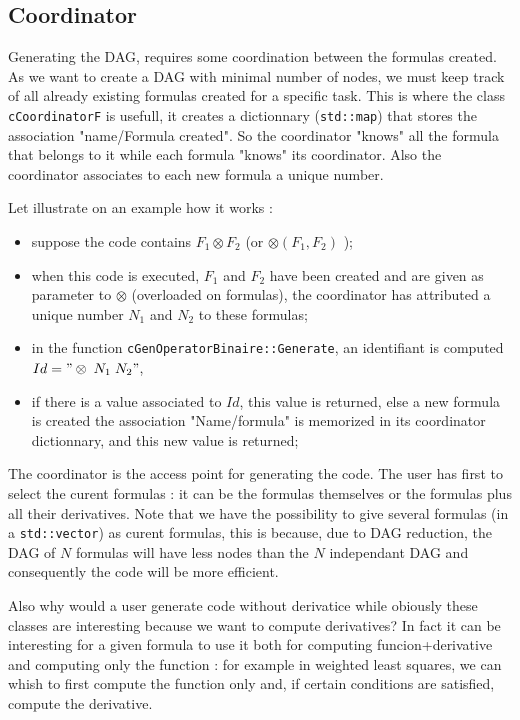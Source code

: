 
\subsection{Coordinator}

Generating the DAG, requires some coordination between the formulas created.
As we want to create a DAG with  minimal number of nodes, we must keep track
of all already existing formulas created for a specific task.
This is where the class {\tt cCoordinatorF} is usefull,  it creates a dictionnary ({\tt std::map})
that stores the association "name/Formula created".  So the coordinator "knows" all the 
formula that belongs to it while each formula "knows" its coordinator. Also the coordinator
associates to each new formula a unique number.

Let illustrate on an example how it works :

\begin{itemize}
	\item  suppose the code contains  $F_1\otimes F_2$  (or  $\otimes(F_1,F_2)$ );
	\item  when this code is executed, $F_1$ and $F_2$ have been created and are given as
		parameter to $\otimes $ (overloaded on formulas), the coordinator has
		attributed a unique number $N_1$ and $N_2$ to these formulas;
	\item  in the function {\tt cGenOperatorBinaire::Generate}, an identifiant is computed $Id="\otimes \; N_1 \; N_2" $,
	\item  if there is a value associated to $Id$, this value is returned, else a new formula is created 
	       the association "Name/formula" is memorized in its coordinator dictionnary, and this new value is returned;
\end{itemize}

The coordinator  is the access point for generating the code. The user has first to select the curent formulas :
it can be the formulas themselves or the formulas plus all their derivatives.
Note that we have the possibility to give several formulas (in a {\tt std::vector}) as curent formulas,
this is because, due to DAG reduction,  the  DAG of $N$ formulas will have less nodes
than the $N$ independant DAG and consequently the code will be more efficient.

Also why would a user generate code without derivatice while
obiously these classes are interesting because we want to compute derivatives? 
In fact  it can be interesting for a given formula to use it both for  computing funcion+derivative and
computing  only the function : for example in weighted least squares, we can whish to first compute the function
only and, if certain conditions are satisfied, compute the derivative.

